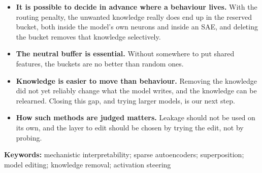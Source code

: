 \documentclass[11pt,a4paper]{article}
\begin{document}
\begin{itemize}
  \item \textbf{It is possible to decide in advance where a behaviour lives.} With the routing
        penalty, the unwanted knowledge really does end up in the reserved bucket, both inside the
        model's own neurons and inside an SAE, and deleting the bucket removes that knowledge
        selectively.
  \item \textbf{The neutral buffer is essential.} Without somewhere to put shared features, the
        buckets are no better than random ones.
  \item \textbf{Knowledge is easier to move than behaviour.} Removing the knowledge did not yet
        reliably change what the model writes, and the knowledge can be relearned. Closing this gap,
        and trying larger models, is our next step.
  \item \textbf{How such methods are judged matters.} Leakage should not be used on its own, and the
        layer to edit should be chosen by trying the edit, not by probing.
\end{itemize}

\noindent\textbf{Keywords:} mechanistic interpretability; sparse autoencoders; superposition;
model editing; knowledge removal; activation steering

{\small


}
\end{document}

